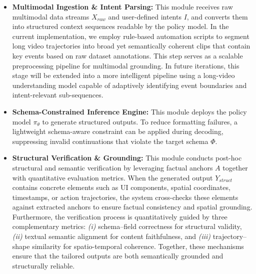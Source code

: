 \documentclass{llmxive}
\begin{document}
    

\begin{itemize}[leftmargin=20pt, labelsep=4pt]
    \item \textbf{Multimodal Ingestion \& Intent Parsing:} This module receives raw multimodal data streams \(X_{raw}\) and user-defined intents \(I\), and converts them into structured context sequences readable by the policy model. 
    In the current implementation, we employ rule-based automation scripts to segment long video trajectories into broad yet semantically coherent clips that contain key events based on raw dataset annotations. 
    This step serves as a scalable preprocessing pipeline for multimodal grounding. 
    In future iterations, this stage will be extended into a more intelligent pipeline using a long-video understanding model capable of adaptively identifying event boundaries and intent-relevant sub-sequences.
    
    \item \textbf{Schema-Constrained Inference Engine:} This module deploys the policy model \(\pi_\theta\) to generate structured outputs. To reduce formatting failures, a lightweight schema-aware constraint can be applied during decoding, suppressing invalid continuations that violate the target schema \(\Phi\).
    
    \item \textbf{Structural Verification \& Grounding:} 
This module conducts post-hoc structural and semantic verification by leveraging factual anchors \(A\) together with quantitative evaluation metrics. 
When the generated output \(Y_{struct}\) contains concrete elements such as UI components, spatial coordinates, timestamps, or action trajectories, the system cross-checks these elements against extracted anchors to ensure factual consistency and spatial grounding. 
Furthermore, the verification process is quantitatively guided by three complementary metrics: 
\textit{(i)} schema–field correctness for structural validity, 
\textit{(ii)} textual semantic alignment for content faithfulness, and 
\textit{(iii)} trajectory–shape similarity for spatio-temporal coherence. 
Together, these mechanisms ensure that the tailored outputs are both semantically grounded and structurally reliable.
\end{itemize}
\end{document}

